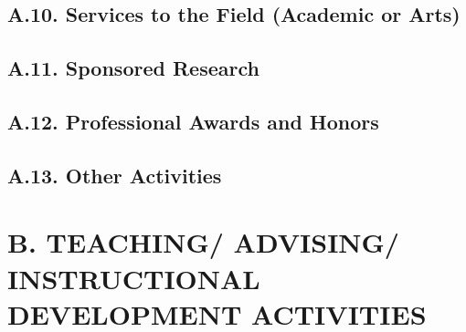 \documentclass[10pt]{article}
\begin{document}
\subsection*{A.10. Services to the Field (Academic or Arts)}


\subsection*{A.11. Sponsored Research}




\subsection*{A.12. Professional Awards and Honors}






\subsection*{A.13. Other Activities}



\section*{B. TEACHING/ ADVISING/ INSTRUCTIONAL DEVELOPMENT ACTIVITIES}
\end{document}

